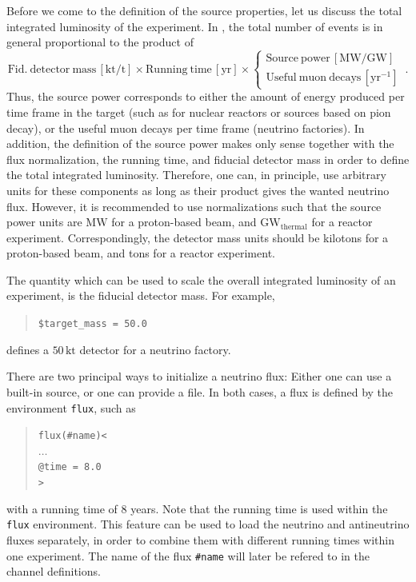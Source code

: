 Before we come to the definition of the source properties, let us discuss
the total integrated luminosity of the experiment. In \GLOBES , the total number of events is in general proportional to the product of
\begin{equation}
\mathrm{Fid.~detector~mass}\,\left[\mathrm{kt/t}\right]\times 
\mathrm{Running~time} \,\left[\mathrm{yr}\right]\times\left\{ \begin{array}{c}
\mathrm{Source~power}\,\left[\mathrm{MW/GW}\right]\\
\mathrm{Useful~muon~decays}\,\left[\mathrm{yr}^{-1}\right]
\end{array}\right.\,.
\end{equation}
Thus, the source power corresponds to either the amount of energy produced per time frame in the target (such as for nuclear reactors or sources based on pion decay), or the useful muon decays per time frame (neutrino factories). In addition, the definition of the source power makes only sense together with the flux normalization, the running time, and fiducial detector mass in order to define the total integrated luminosity. Therefore, one can, in principle, use arbitrary units for these components as long as their product gives the wanted neutrino flux. However, it is
recommended to use normalizations such that the source power units are $\mathrm{MW}$ for a proton-based beam, and $\mathrm{GW}_\mathrm{thermal}$ for a reactor experiment. Correspondingly, the detector mass units should be kilotons for a proton-based beam, and tons for a reactor experiment.

The quantity which can be used to scale the overall integrated luminosity of an experiment, is the fiducial detector mass. For example,
\begin{quote}
{\tt \$target\_mass = 50.0 }
\end{quote}
defines a $50 \, \mathrm{kt}$ detector for a neutrino factory.

There are two principal ways to initialize a neutrino flux: 
Either one can use 
a built-in source, or one can provide a file. In both cases,
a flux is defined by the environment {\tt flux}, such as
\begin{quote}
  {\tt flux(\#name)<\\
\tb $\ldots$\\
\tb @time = 8.0 \\
>}
\end{quote}
with a running time of $8$ years. Note that the running time is used within
the {\tt flux} environment. This feature can be used to load the neutrino and antineutrino fluxes separately, in order to combine them with different
running times within one experiment. The name of the flux {\tt \#name} will later be refered to in the channel definitions.

